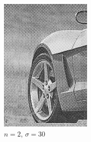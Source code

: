\documentclass[
	12pt, %
]{style/fphw}
\begin{document}
\begin{figure}[H]
\begin{subfigure}[b]{.22\textwidth}
             \includegraphics[width=\textwidth]{Q5_3_2_30.png}
             \caption{$n=2$, $\sigma=30$}
             \label{Q5_3_2_30}
         \end{subfigure}
         \hfill
         \begin{subfigure}[b]{.22\textwidth}
             \centering

\end{subfigure}
\end{figure}
\end{document}
